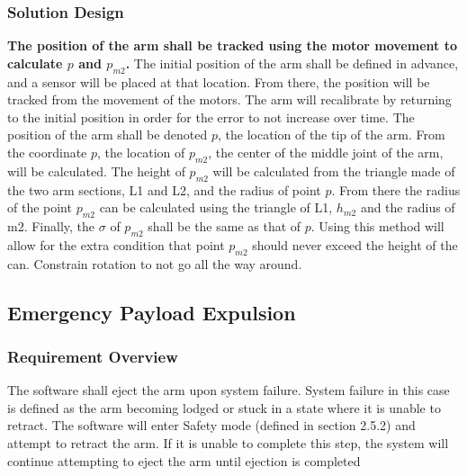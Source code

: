 \documentclass[letterpaper,10pt]{article}
\begin{document}
\subsubsection{Solution Design}
\textbf{The position of the arm shall be tracked using the motor movement to calculate \(p\) and 
\(p_{m2}\).}
The initial position of the arm shall be defined in advance, and a sensor will be placed at that location. 
From there, the position will be tracked from the movement of the motors.
The arm will recalibrate by returning to the initial position in order for the error to not increase over
 time.
The position of the arm shall be denoted \(p\), the location of the tip of the arm.
From the coordinate \(p\), the location of \(p_{m2}\), the center of the middle joint of the arm, will be
 calculated. The height of \(p_{m2}\) will be calculated from the triangle made of the two arm sections, 
L1 and L2, and the radius of point \(p\). From there the radius of the point \(p_{m2}\) can be calculated
 using the triangle of L1, \(h_{m2}\) and the radius of m2. Finally, the \(\sigma\) of \(p_{m2}\) shall 
be the same as that of \(p\).
Using this method will allow for the extra condition that point \(p_{m2}\) should never exceed the height
 of the can.
Constrain rotation to not go all the way around.

\subsection{Emergency Payload Expulsion}
\subsubsection{Requirement Overview}
The software shall eject the arm upon system failure. 
System failure in this case is defined as the arm becoming lodged or stuck in a state where it is unable to retract.
The software will enter Safety mode (defined in section 2.5.2) and attempt to retract the arm. If it is unable to complete this step,
 the system will continue attempting to eject the arm until ejection is completed
\end{document}
